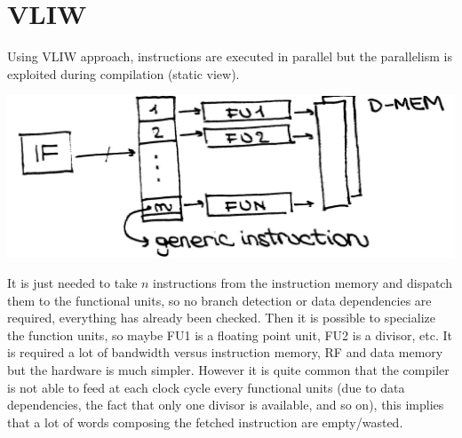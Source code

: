 \section{VLIW}
Using VLIW approach, instructions are executed in parallel but the parallelism
is exploited during compilation (static view).
\begin{center}
  \includegraphics[width=0.7\linewidth]{img/img3/6}
\end{center}
It is just needed to take $n$ instructions from the instruction memory and
dispatch them to the functional units, so no branch detection or data
dependencies are required, everything has already been checked. Then it is
possible to specialize the function units, so maybe FU1 is a floating point
unit, FU2 is a divisor, etc. It is required a lot of bandwidth versus
instruction memory, RF and data memory but the hardware is much simpler.
However it is quite common that the compiler is not able to feed at each clock
cycle every functional units (due to data dependencies, the fact that only one
divisor is available, and so on), this implies that a lot of words composing
the fetched  instruction are empty/wasted.

